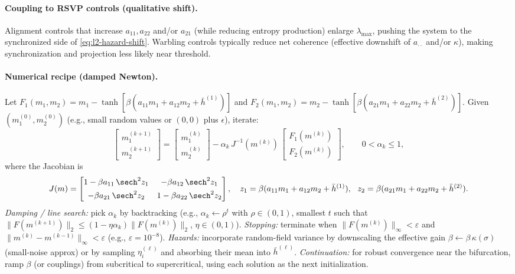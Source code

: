 \documentclass[a4paper,11pt]{article}
\begin{document}
\paragraph{Coupling to RSVP controls (qualitative shift).}
Alignment controls that increase $a_{11},a_{22}$ and/or $a_{21}$ (while reducing entropy production) enlarge $\lambda_{\max}$, pushing the system to the synchronized side of \eqref{eq:l2-hazard-shift}. Warbling controls typically reduce net coherence (effective downshift of $a_{\cdot\cdot}$ and/or $\kappa$), making synchronization and projection less likely near threshold.

\paragraph{Numerical recipe (damped Newton).}
Let $F_1(m_1,m_2)=m_1-\tanh[\beta(a_{11}m_1+a_{12}m_2+\bar h^{(1)})]$ and
$F_2(m_1,m_2)=m_2-\tanh[\beta(a_{21}m_1+a_{22}m_2+\bar h^{(2)})]$.
Given $(m_1^{(0)},m_2^{(0)})$ (e.g., small random values or $(0,0)$ plus $\epsilon$), iterate:
\[
\begin{bmatrix} m_1^{(k+1)} \\[2pt] m_2^{(k+1)} \end{bmatrix}
=
\begin{bmatrix} m_1^{(k)} \\[2pt] m_2^{(k)} \end{bmatrix}
-\alpha_k\, J^{-1}(m^{(k)})\,
\begin{bmatrix} F_1(m^{(k)}) \\[2pt] F_2(m^{(k)}) \end{bmatrix},
\qquad 0<\alpha_k\le 1,
\]
where the Jacobian is
\[
J(m)=
\begin{bmatrix}
1-\beta a_{11}\,\sech^2 z_1 & -\beta a_{12}\,\sech^2 z_1\\[4pt]
-\beta a_{21}\,\sech^2 z_2 & 1-\beta a_{22}\,\sech^2 z_2
\end{bmatrix},
\quad
z_1=\beta(a_{11}m_1+a_{12}m_2+\bar h^{(1)}),\ \
z_2=\beta(a_{21}m_1+a_{22}m_2+\bar h^{(2)}).
\]
\emph{Damping / line search:} pick $\alpha_k$ by backtracking (e.g., $\alpha_k\!\leftarrow\! \rho^t$ with $\rho\!\in\!(0,1)$, smallest $t$ such that
$\|F(m^{(k+1)})\|_2 \le (1-\eta\alpha_k)\|F(m^{(k)})\|_2$, $\eta\!\in\!(0,1)$).
\emph{Stopping:} terminate when $\|F(m^{(k)})\|_\infty<\varepsilon$ and $\|m^{(k)}-m^{(k-1)}\|_\infty<\varepsilon$ (e.g., $\varepsilon=10^{-8}$).
\emph{Hazards:} incorporate random-field variance by downscaling the effective gain
$\beta\leftarrow\beta\,\kappa(\sigma)$ (small-noise approx) or by sampling $\eta_i^{(\ell)}$ and absorbing their mean into $\bar h^{(\ell)}$.
\emph{Continuation:} for robust convergence near the bifurcation, ramp $\beta$ (or couplings) from subcritical to supercritical, using each solution as the next initialization.
\end{document}
